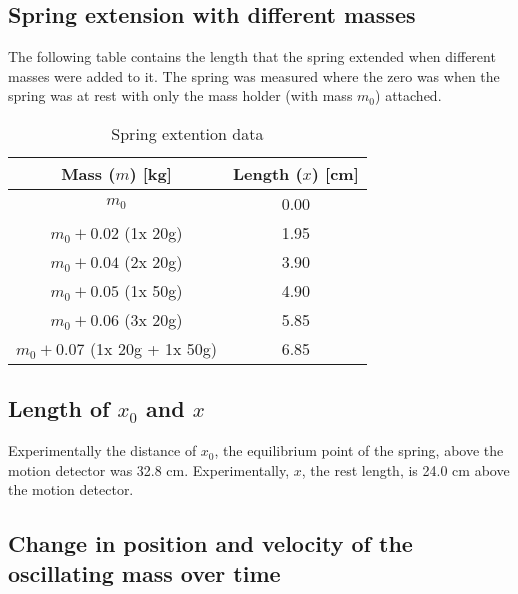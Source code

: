 \documentclass[titlepage]{article}
\begin{document}
        \subsection{Spring extension with different masses}\label{subsec:spring-constant-data}
            The following table contains the length that the spring extended when different masses were added to it.
            The spring was measured where the zero was when the spring was at rest with only the mass holder (with mass $m_0$) attached.
            \begin{table}[H]
                \centering
                \small
                \begin{tabular}{|c|c|}
                    \hline
                    Mass ($m$) [kg]                & Length ($x$) [cm] \\
                    \hline
                    $m_0$                          & 0.00              \\
                    \hline
                    $m_0 + 0.02$ (1x 20g)          & 1.95              \\
                    \hline
                    $m_0 + 0.04$ (2x 20g)          & 3.90              \\
                    \hline
                    $m_0 + 0.05$ (1x 50g)          & 4.90              \\
                    \hline
                    $m_0 + 0.06$ (3x 20g)          & 5.85              \\
                    \hline
                    $m_0 + 0.07$ (1x 20g + 1x 50g) & 6.85              \\
                    \hline
                \end{tabular}
                \caption{Spring extention data}\label{tab:spring-extention-data}
            \end{table}
        
        \subsection{Length of $x_0$ and $x$}\label{subsec:length-of-x0 and x}
            Experimentally the distance of $x_0$, the equilibrium point of the spring, above the motion detector was 32.8 cm.
            Experimentally, $x$, the rest length, is 24.0 cm above the motion detector.
        
        \subsection{Change in position and velocity of the oscillating mass over time}\label{subsec:change-in-position-and-velocity-of-the-oscillating-mass-over-time}
            
\end{document}

